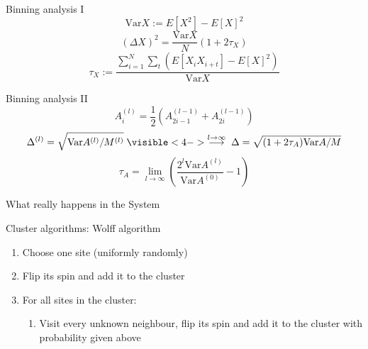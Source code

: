 \documentclass[]{beamer}
\begin{document}
\begin{frame}{Binning analysis I}
\pause
\[ \text{Var} X := E \left[ X^2 \right] - E \left[ X \right]^2 \]
\pause
\[ (\Delta X)^2 = \frac{\text{Var}X}{N}\left(1+2\tau_X\right) \]
\pause
\[ \tau_X := \frac{\sum\limits_{i=1}^N\sum\limits_t \left( E\left[ X_i X_{i+t} \right]-E \left [X \right] ^2 \right)}{\text{Var}X} \]
\end{frame}

\begin{frame}{Binning analysis II}
\pause
\[ A_i^{(l)} = \frac{1}{2} \left( A_{2i-1}^{(l-1)} + A_{2i}^{(l-1)} \right) \]
\pause
\[ \Delta^{(l)} = \sqrt{\text{Var}A^{(l)}/M^{(l)}}  \; \visible<4->{\stackrel{l \rightarrow \infty}{\longrightarrow} \; \Delta = \sqrt{(1+2\tau_A)\text{Var}A/M}} \]
\pause[5]
\[ \tau_A = \lim_{l\rightarrow\infty}\left( \frac{2^l \text{Var} A^{(l)}}{\text{Var} A^{(0)}} - 1 \right) \]
\end{frame}

\begin{frame}{What really happens in the System}
\end{frame}

\begin{frame}{Cluster algorithms: Wolff algorithm}
\begin{enumerate}
\item<2-> Choose one site (uniformly randomly)
\item<3-> Flip its spin and add it to the cluster
\item<4-> For all sites in the cluster:
	\begin{enumerate}
	\item Visit every unknown neighbour, flip its spin and add it to the cluster with probability given above
	\end{enumerate}
\end{enumerate}
\note{ }
\end{frame}
\end{document}
